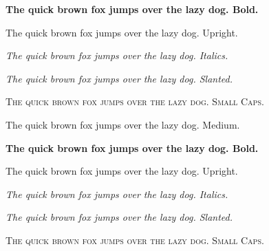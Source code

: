 \textbf{The quick brown fox jumps over the lazy dog. Bold.}

\textup{The quick brown fox jumps over the lazy dog. Upright.}

\textit{The quick brown fox jumps over the lazy dog. Italics.}

\textsl{The quick brown fox jumps over the lazy dog. Slanted.}

\textsc{The quick brown fox jumps over the lazy dog. Small Caps.}

\rmfamily\blindtext

\textmd{The quick brown fox jumps over the lazy dog. Medium.}

\textbf{The quick brown fox jumps over the lazy dog. Bold.}

\textup{The quick brown fox jumps over the lazy dog. Upright.}

\textit{The quick brown fox jumps over the lazy dog. Italics.}

\textsl{The quick brown fox jumps over the lazy dog. Slanted.}

\textsc{The quick brown fox jumps over the lazy dog. Small Caps.}

